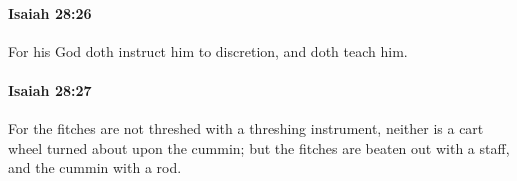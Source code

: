 		\paragraph{Isaiah 28:26} %
			\label{ISAIAH-28-26}

			For his God doth instruct him to discretion, and doth teach him.


		\paragraph{Isaiah 28:27} %
			\label{ISAIAH-28-27}

			For the fitches are not threshed with a threshing instrument, neither is a cart wheel turned about upon the cummin; but the fitches are beaten out with a staff, and the cummin with a rod.


